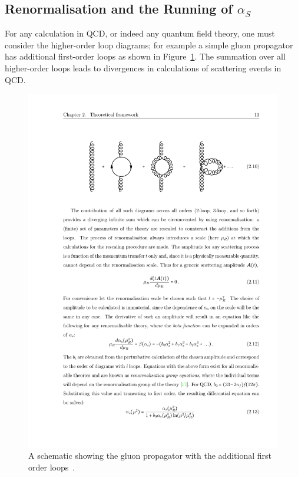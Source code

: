 \subsection{Renormalisation and the Running of $\alpha_S$}
\label{sec:theo-qcd_dijet_running}

For any calculation in QCD, or indeed any quantum field theory, one must consider the higher-order loop diagrams;
for example a simple gluon propagator has additional first-order loops as shown in Figure~\ref{fig:theo-qcd_gluon}.
The summation over all higher-order loops leads to divergences in calculations of scattering events in QCD.

\begin{figure}[!hbt]
  \begin{center}
    \includegraphics[width=0.7\linewidth, angle=0]{figs/Theory/qcd_gluon_loop.pdf}
  \end{center}
  \caption[A schematic showing the gluon propagator with the additional first order loops.]
  {A schematic showing the gluon propagator with the additional first order loops~\cite{det-thesis_kate}.}
  \label{fig:theo-qcd_gluon}
\end{figure}

